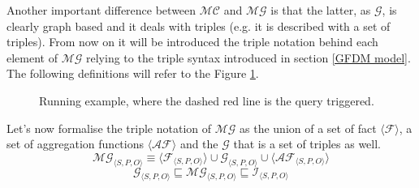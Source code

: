 \documentclass[12pt,a4paper]{report}
\newcommand\targetGraph{\mathcal{G}}
\newcommand\integrationGraph{\mathcal{I}}
\newcommand\subject{S}
\newcommand\predicate{P}
\newcommand\object{O}
\newcommand\triple[1]{#1_{\set{\subject,\predicate,\object}}}
\newcommand\multidimensionalCube{\mathcal{MC}}
\newcommand\fact{\mathcal{F}}
\newcommand\multidimensionalGraph{\mathcal{MG}}
\newcommand\aggregatingFunction{\mathcal{AF}}
\newcommand\set[1]{\langle #1 \rangle}
\begin{document}
%
Another important difference between $\multidimensionalCube$ and $\multidimensionalGraph$ is that the latter, as $\targetGraph$, is clearly graph based and it deals with triples (e.g. it is described with a set of triples).
%
From now on it will be introduced the triple notation behind each element of $\multidimensionalGraph$ relying to the triple syntax introduced in section \ref{GFDM model}.
%
The following definitions will refer to the Figure \ref{fig:running_example}.
%
\begin{figure} [ht]
    \caption{Running example, where the dashed red line is the query triggered.}
    \label{fig:running_example}
\end{figure}

Let's now formalise the triple notation of $\multidimensionalGraph$ as the union of a set of fact $\set{\fact}$, a set of aggregation functions $\set{\aggregatingFunction}$ and the $\targetGraph$ that is a set of triples as well.
%
\begin{equation}
    \triple{\multidimensionalGraph} \equiv \set{\triple{\fact}} \cup \triple{\targetGraph} \cup \set{\triple{\aggregatingFunction}}
\end{equation}
\begin{equation}
    \triple{\targetGraph} \sqsubseteq \triple{\multidimensionalGraph} \sqsubseteq \triple{\integrationGraph}
\end{equation}
\end{document}
